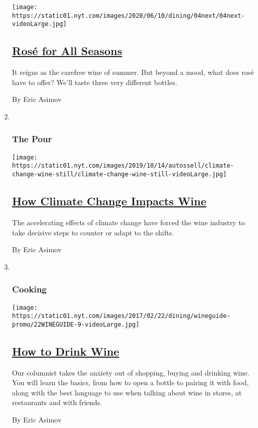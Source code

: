 \begin{enumerate}
  \texttt{[image: https://static01.nyt.com/images/2020/06/10/dining/04next/04next-videoLarge.jpg]}

  \hypertarget{rosuxe9-for-all-seasons}{%
  \subsection{\texorpdfstring{\href{/2020/06/04/dining/drinks/wine-school-assignment-rose.html}{Rosé
  for All
  Seasons}}{Rosé for All Seasons}}\label{rosuxe9-for-all-seasons}}

  It reigns as the carefree wine of summer. But beyond a mood, what does
  rosé have to offer? We'll taste three very different bottles.

  By Eric Asimov
\item ~
  \hypertarget{the-pour-2}{%
  \subsubsection{The Pour}\label{the-pour-2}}

  \texttt{[image: https://static01.nyt.com/images/2019/10/14/autossell/climate-change-wine-still/climate-change-wine-still-videoLarge.jpg]}

  \hypertarget{how-climate-change-impacts-wine}{%
  \subsection{\texorpdfstring{\href{/interactive/2019/10/14/dining/drinks/climate-change-wine.html}{How
  Climate Change Impacts
  Wine}}{How Climate Change Impacts Wine}}\label{how-climate-change-impacts-wine}}

  The accelerating effects of climate change have forced the wine
  industry to take decisive steps to counter or adapt to the shifts.

  By Eric Asimov
\item ~
  \hypertarget{cooking}{%
  \subsubsection{Cooking}\label{cooking}}

  \texttt{[image: https://static01.nyt.com/images/2017/02/22/dining/wineguide-promo/22WINEGUIDE-9-videoLarge.jpg]}

  \hypertarget{how-to-drink-wine}{%
  \subsection{\texorpdfstring{\href{/interactive/2018/11/28/dining/drinks/how-to-drink-wine.html}{How
  to Drink Wine}}{How to Drink Wine}}\label{how-to-drink-wine}}

  Our columnist takes the anxiety out of shopping, buying and drinking
  wine. You will learn the basics, from how to open a bottle to pairing
  it with food, along with the best language to use when talking about
  wine in stores, at restaurants and with friends.

  By Eric Asimov
\end{enumerate}

